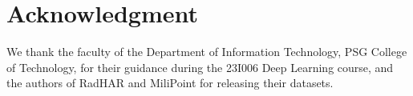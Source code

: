 \documentclass[conference]{IEEEtran}
\begin{document}







\section*{Acknowledgment}
We thank the faculty of the Department of Information Technology, PSG College of
Technology, for their guidance during the 23I006 Deep Learning course, and the
authors of RadHAR and MiliPoint for releasing their datasets.



\end{document}
